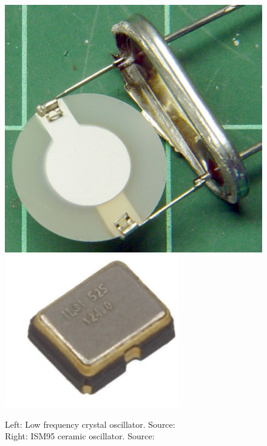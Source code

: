         \begin{figure}[H]
            \centering
            \includegraphics[width=0.35\paperwidth]{img/06/crystal.png}
                        \includegraphics[width=0.35\paperwidth]{img/06/ISM95.png}
              \caption[Left: Low frequency crystal oscillator. Source: \cite{Opening_a_Quartz_Crystal_Can_Effects_Thereof}; Right: ISM95 ceramic oscillator. Source: \cite{ISM95_series_datasheet}]
            {Left: Low frequency crystal oscillator. Source: \cite{Opening_a_Quartz_Crystal_Can_Effects_Thereof} \\ Right: ISM95 ceramic oscillator. Source: \cite{ISM95_series_datasheet}\endtabular}
            \label{crystal_oscillator_difference}
        \end{figure}

